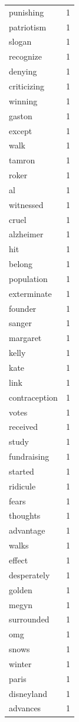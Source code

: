 \begin{tabular}{lr}
punishing & 1 \\
patriotism & 1 \\
slogan & 1 \\
recognize & 1 \\
denying & 1 \\
criticizing & 1 \\
winning & 1 \\
gaston & 1 \\
except & 1 \\
walk & 1 \\
tamron & 1 \\
roker & 1 \\
al & 1 \\
witnessed & 1 \\
cruel & 1 \\
alzheimer & 1 \\
hit & 1 \\
belong & 1 \\
population & 1 \\
exterminate & 1 \\
founder & 1 \\
sanger & 1 \\
margaret & 1 \\
kelly & 1 \\
kate & 1 \\
link & 1 \\
contraception & 1 \\
votes & 1 \\
received & 1 \\
study & 1 \\
fundraising & 1 \\
started & 1 \\
ridicule & 1 \\
fears & 1 \\
thoughts & 1 \\
advantage & 1 \\
walks & 1 \\
effect & 1 \\
desperately & 1 \\
golden & 1 \\
megyn & 1 \\
surrounded & 1 \\
omg & 1 \\
snows & 1 \\
winter & 1 \\
paris & 1 \\
disneyland & 1 \\
advances & 1 \\

\end{tabular}
